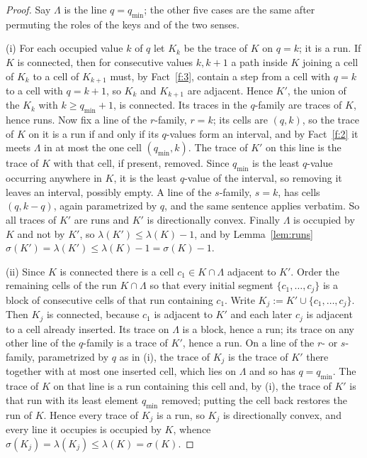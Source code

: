 \documentclass[11pt]{article}
\theoremstyle{plain}
\theoremstyle{definition}
\theoremstyle{remark}
\begin{document}
\begin{proof}
Say \(\Lambda\) is the line \(q=q_{\min}\); the other five cases are the same after
permuting the roles of the keys and of the two senses.

(i) For each occupied value \(k\) of \(q\) let \(K_{k}\) be the trace of \(K\) on
\(q=k\); it is a run. If \(K\) is connected, then for consecutive values \(k,k+1\) a path
inside \(K\) joining a cell of \(K_{k}\) to a cell of \(K_{k+1}\) must, by
Fact~\ref{f:3}, contain a step from a cell with \(q=k\) to a cell with \(q=k+1\), so
\(K_{k}\) and \(K_{k+1}\) are adjacent. Hence \(K'\), the union of the \(K_{k}\) with
\(k\ge q_{\min}+1\), is connected. Its traces in the \(q\)-family are traces of \(K\),
hence runs. Now fix a line of the \(r\)-family, \(r=k\); its cells are \((q,k)\), so the
trace of \(K\) on it is a run if and only if its \(q\)-values form an interval, and by
Fact~\ref{f:2} it meets \(\Lambda\) in at most the one cell \((q_{\min},k)\). The trace of
\(K'\) on this line is the trace of \(K\) with that cell, if present, removed. Since
\(q_{\min}\) is the least \(q\)-value occurring anywhere in \(K\), it is the least
\(q\)-value of the interval, so removing it leaves an interval, possibly empty. A line of
the \(s\)-family, \(s=k\), has cells \((q,k-q)\), again parametrized by \(q\), and the
same sentence applies verbatim. So all traces of \(K'\) are runs and \(K'\) is
directionally convex. Finally \(\Lambda\) is occupied by
\(K\) and not by \(K'\), so \(\lambda(K')\le\lambda(K)-1\), and by Lemma~\ref{lem:runs}
\(\sigma(K')=\lambda(K')\le\lambda(K)-1=\sigma(K)-1\).

(ii) Since \(K\) is connected there is a cell \(c_{1}\in K\cap\Lambda\) adjacent to
\(K'\). Order the remaining cells of the run \(K\cap\Lambda\) so that every initial
segment \(\{c_{1},\dots,c_{j}\}\) is a block of consecutive cells of that run containing
\(c_{1}\). Write \(K_{j}:=K'\cup\{c_{1},\dots,c_{j}\}\). Then \(K_{j}\) is connected,
because \(c_{1}\) is adjacent to \(K'\) and each later \(c_{j}\) is adjacent to a cell
already inserted. Its trace on \(\Lambda\) is a block, hence a run; its trace on any other
line of the \(q\)-family is a trace of \(K'\), hence a run. On a line of the \(r\)- or
\(s\)-family, parametrized by \(q\) as in (i), the trace of \(K_{j}\) is the trace of
\(K'\) there together with at most one inserted cell, which lies on \(\Lambda\) and so
has \(q=q_{\min}\). The trace of \(K\) on that line is a run containing this cell and, by
(i), the trace of \(K'\) is that run with its least element \(q_{\min}\) removed; putting
the cell back restores the run of \(K\). Hence every trace of \(K_{j}\) is a run, so
\(K_{j}\) is directionally convex, and every line it occupies is occupied by \(K\), whence
\(\sigma(K_{j})=\lambda(K_{j})\le\lambda(K)=\sigma(K)\).
\end{proof}
\end{document}
